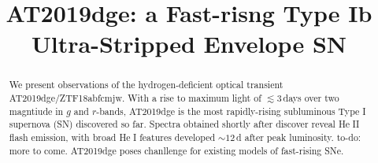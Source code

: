 \documentclass[twocolumn]{aastex63}
\def\ion#1#2{#1$\;${\footnotesize\rm{#2}}\relax}
\newcommand{\todo}[1]{{\color{magenta} to-do: {#1}}}
\begin{document}
\begin{CJK*}{UTF8}{gbsn}

\title{AT2019dge: a Fast-risng Type Ib Ultra-Stripped Envelope SN}






\begin{abstract}

We present observations of the hydrogen-deficient optical transient AT2019dge/ZTF18abfcmjw. With 
a rise to maximum light of $\lesssim 3$\,days over two magntiude in $g$ and $r$-bands, AT2019dge is 
the most rapidly-rising subluminous Type I supernova (SN) discovered so far. Spectra obtained shortly 
after discover reveal \ion{He}{II} flash emission, with broad \ion{He}{I} features developed $\sim12$\,d 
after peak luminosity. \todo{more to come.} AT2019dge poses chanllenge for existing models of 
fast-rising SNe.

\end{abstract}




\end{CJK*}
\end{document}

